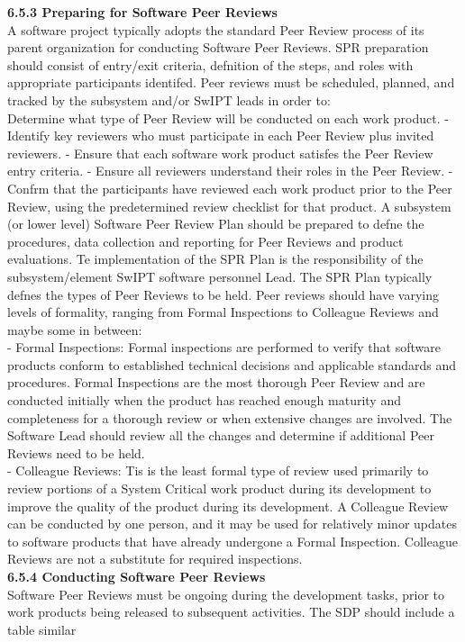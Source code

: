 \documentclass[twocolumn,a4paper,13pt]{book}
\begin{document}
\textbf{6.5.3 Preparing for Software Peer Reviews}\\
A software project typically adopts the standard Peer Review
process of its parent organization for conducting Software
Peer Reviews. SPR preparation should consist of entry/exit
criteria, defnition of the steps, and roles with appropriate participants identifed. Peer reviews must be scheduled, planned,
and tracked by the subsystem and/or SwIPT leads in order to:\\
Determine what type of Peer Review will be conducted
on each work product.
- Identify key reviewers who must participate in each
Peer Review plus invited reviewers.
- Ensure that each software work product satisfes the
Peer Review entry criteria.
- Ensure all reviewers understand their roles in the Peer
Review.
- Confrm that the participants have reviewed each work
product prior to the Peer Review, using the predetermined review checklist for that product.
A subsystem (or lower level) Software Peer Review Plan
should be prepared to defne the procedures, data collection and reporting for Peer Reviews and product evaluations. Te
implementation of the SPR Plan is the responsibility of the
subsystem/element SwIPT software personnel Lead. The SPR
Plan typically defnes the types of Peer Reviews to be held.
Peer reviews should have varying levels of formality, ranging
from Formal Inspections to Colleague Reviews and maybe
some in between:\\
- Formal Inspections: Formal inspections are performed
to verify that software products conform to established
technical decisions and applicable standards and procedures. Formal Inspections are the most thorough
Peer Review and are conducted initially when the
product has reached enough maturity and completeness for a thorough review or when extensive changes
are involved. The Software Lead should review all the
changes and determine if additional Peer Reviews need
to be held.\\
- Colleague Reviews: Tis is the least formal type of
review used primarily to review portions of a System
Critical work product during its development to
improve the quality of the product during its development. A Colleague Review can be conducted by one
person, and it may be used for relatively minor updates
to software products that have already undergone a
Formal Inspection. Colleague Reviews are not a substitute for required inspections.\\
\textbf{6.5.4 Conducting Software Peer Reviews}\\
Software Peer Reviews must be ongoing during the development tasks, prior to work products being released to subsequent activities. The SDP should include a table similar
\end{document}
